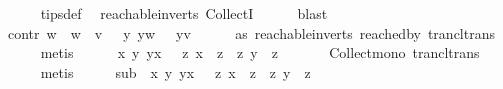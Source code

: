 \begin{isabellebody}
\ \ \ \ \isamarkupfalse%
\ tips{\isacharunderscore}{\kern0pt}def\ \isamarkupfalse%
\ reachable{}{\isacharunderscore}{\kern0pt}in{\isacharunderscore}{\kern0pt}verts{\isacharparenleft}{\kern0pt}{}{\isacharparenright}{\kern0pt}\ CollectI\isanewline
\ \ \ \ \isamarkupfalse%
\ blast\ \isanewline
\ \ \isamarkupfalse%
\ \isamarkupfalse%
\ contr{\isacharcolon}{\kern0pt}\ {\isachardoublequoteopen}{\isasymforall}w{\isachardot}{\kern0pt}\ \ w\ {\isasymrightarrow}\isactrlsup {\isacharplus}{\kern0pt}\ v\ {\isasymlongrightarrow}\ \ {\isacharparenleft}{\kern0pt}{\isasymexists}y{\isachardot}{\kern0pt}\ y{\isasymrightarrow}\isactrlsup {\isacharplus}{\kern0pt}w\ {\isasymand}\ \ y{\isasymrightarrow}\isactrlsup {\isacharplus}{\kern0pt}v{\isacharparenright}{\kern0pt}{\isachardoublequoteclose}\isanewline
\ \ \ \ \isamarkupfalse%
\ as{}\ reachable{}{\isacharunderscore}{\kern0pt}in{\isacharunderscore}{\kern0pt}verts{\isacharparenleft}{\kern0pt}{}{\isacharparenright}{\kern0pt}\ reached{\isacharunderscore}{\kern0pt}by\ trancl{\isacharunderscore}{\kern0pt}trans\ \isanewline
\ \ \ \ \isamarkupfalse%
\ metis\ \isanewline
\ \ \isamarkupfalse%
\ {\isachardoublequoteopen}{\isasymforall}\ x\ y{\isachardot}{\kern0pt}\ y{\isasymrightarrow}\isactrlsup {\isacharplus}{\kern0pt}x\ {\isasymlongrightarrow}\ \ {\isacharbraceleft}{\kern0pt}z{\isachardot}{\kern0pt}\ x\ {\isasymrightarrow}\isactrlsup {\isacharplus}{\kern0pt}\ z{\isacharbraceright}{\kern0pt}\ {\isasymsubseteq}\ {\isacharbraceleft}{\kern0pt}z{\isachardot}{\kern0pt}\ y\ {\isasymrightarrow}\isactrlsup {\isacharplus}{\kern0pt}\ z{\isacharbraceright}{\kern0pt}{\isachardoublequoteclose}\isanewline
\ \ \ \ \isamarkupfalse%
\ \ Collect{\isacharunderscore}{\kern0pt}mono\ trancl{\isacharunderscore}{\kern0pt}trans\isanewline
\ \ \ \ \isamarkupfalse%
\ metis\isanewline
\ \ \isamarkupfalse%
\ \isamarkupfalse%
\ sub{\isacharcolon}{\kern0pt}\ {\isachardoublequoteopen}{\isasymforall}\ x\ y{\isachardot}{\kern0pt}\ y{\isasymrightarrow}\isactrlsup {\isacharplus}{\kern0pt}x\ {\isasymlongrightarrow}\ \ {\isacharbraceleft}{\kern0pt}z{\isachardot}{\kern0pt}\ x\ {\isasymrightarrow}\isactrlsup {\isacharplus}{\kern0pt}\ z{\isacharbraceright}{\kern0pt}\ {\isasymsubset}\ {\isacharbraceleft}{\kern0pt}z{\isachardot}{\kern0pt}\ y\ {\isasymrightarrow}\isactrlsup {\isacharplus}{\kern0pt}\ z{\isacharbraceright}{\kern0pt}{\isachardoublequoteclose}\isanewline

\end{isabellebody}

